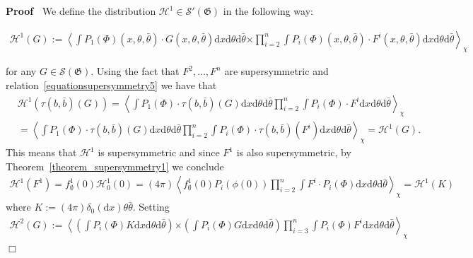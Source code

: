 \documentclass[a4paper,10pt]{article}
\newcommand{\assign}{:=}
\newcommand{\mathd}{\mathrm{d}}
\newenvironment{proof}{\noindent\textbf{Proof\ }}{\hspace*{\fill}$\Box$\medskip}
\begin{document}
\begin{proof}
  We define the distribution $\mathcal{H}^1 \in \mathcal{S}' (\mathfrak{G})$
  in the following way:
  
  \begin{multline*}
    \left. \mathcal{H}^1 (G) \assign \left\langle \int P_1 (\Phi) (x, \theta,
    \bar{\theta}) \cdot G (x, \theta, \bar{\theta}) \mathd x \mathd \theta
    \mathd \bar{\theta} \right. \right. \left. \left. \times \prod^n_{i = 2} \int P_i (\Phi) (x, \theta,
    \bar{\theta}) \cdot F^i (x, \theta, \bar{\theta}) \mathd x \mathd \theta
    \mathd \bar{\theta} \right\rangle_{\chi} \right.
  \end{multline*}
  
  for any $G \in \mathcal{S} (\mathfrak{G})$. Using the fact that $F^2,
  \ldots, F^n$ are supersymmetric and
  relation~{\eqref{equationsupersymmetry5}} we have that
  \begin{eqnarray}
    & \mathcal{H}^1 (\tau (b, \bar{b}) (G)) = \left\langle \int P_1 (\Phi)
    \cdot \tau (b, \bar{b}) (G) \mathd x \mathd \theta \mathd \bar{\theta}
    \prod^n_{i = 2} \int P_i (\Phi) \cdot F^i \mathd x \mathd \theta \mathd
    \bar{\theta} \right\rangle_{\chi} & _{} \nonumber\\
    & = \left\langle \int P_1 (\Phi) \cdot \tau (b, \bar{b}) (G) \mathd x
    \mathd \theta \mathd \bar{\theta} \prod^n_{i = 2} \int P_i (\Phi) \cdot
    \tau (b, \bar{b}) (F^i) \mathd x \mathd \theta \mathd \bar{\theta}
    \right\rangle_{\chi} = \mathcal{H}^1 (G) . &  \nonumber
  \end{eqnarray}
  This means that $\mathcal{H}^1$ is supersymmetric and since $F^1$ is also
  supersymmetric, by Theorem~\ref{theorem_supersymmetry1} we conclude
  \begin{multline*}
    \mathcal{H}^1 (F^1) = f^1_{\emptyset} (0) \mathcal{H}^1_0 (0) = (4 \pi) \left\langle f^1_{\emptyset} (0) P_i (\phi (0)) \prod^n_{i = 2}
    \int F^i \cdot P_i (\Phi) \mathd x \mathd \theta \mathd \bar{\theta}
    \right\rangle_{\chi} = \mathcal{H}^1 (K)
  \end{multline*}
  where $K \assign (4 \pi) \delta_0 (\mathd x) \theta \bar{\theta}$. Setting
  \begin{multline*}
    \mathcal{H}^2 (G) \assign \left. \left\langle \left( \int P_i (\Phi) K
    \mathd x \mathd \theta \mathd \bar{\theta} \right) \right. \right.  \left. \left. \times \left( \int P_i (\Phi) G \mathd x \mathd \theta
    \mathd \bar{\theta} \right) \prod^n_{i = 3} \int P_i (\Phi) F^i \mathd x
    \mathd \theta \mathd \bar{\theta} \right\rangle \right._{\chi}

\end{multline*}
\end{proof}
\end{document}
